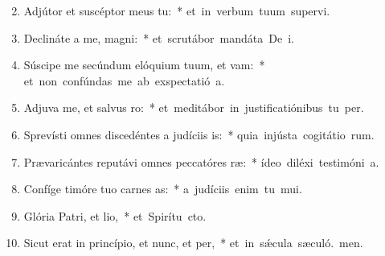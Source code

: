 \begin{flushleft}
\begin{enumerate}[leftmargin=*]
\setcounter{enumi}{1}

\item Adjútor et suscéptor meus  tu:~* \mbox{et in verbum tuum supervi.}
\item Declináte a me, magni:~* \mbox{et scrutábor mandáta De i.}
\item Súscipe me secúndum elóquium tuum, et vam:~* \mbox{et non confúndas me ab exspectatió a.}
\item Adjuva me, et salvus ro:~* \mbox{et meditábor in justificatiónibus tu per.}
\item Sprevísti omnes discedéntes a judíciis is:~* \mbox{quia injústa cogitátio rum.}
\item Prævaricántes reputávi omnes peccatóres ræ:~* \mbox{ídeo diléxi testimóni a.}
\item Confíge timóre tuo carnes as:~* \mbox{a judíciis enim tu mui.}
\item Glória Patri, et lio,~* \mbox{et Spirítu cto.}
\item Sicut erat in princípio, et nunc, et per,~* \mbox{et in s\'{\ae}cula sæculó. men.}

\end{enumerate}
\end{flushleft}

